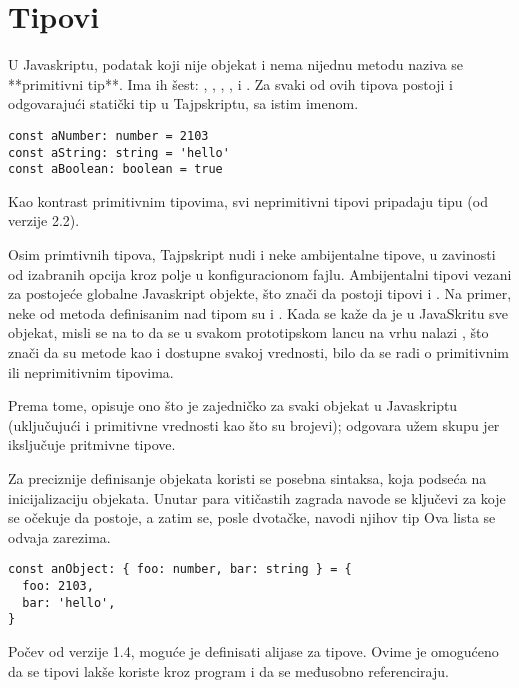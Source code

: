 \section{Tipovi}

U Javaskriptu, podatak koji nije objekat i nema nijednu metodu naziva se **primitivni tip**.
Ima ih šest: , , , ,  i .
Za svaki od ovih tipova postoji i odgovarajući statički tip u Tajpskriptu, sa istim imenom.

\begin{verbatim}
const aNumber: number = 2103
const aString: string = 'hello'
const aBoolean: boolean = true
\end{verbatim}

Kao kontrast primitivnim tipovima, svi neprimitivni tipovi pripadaju tipu  (od verzije 2.2).

Osim primtivnih tipova, Tajpskript nudi i neke ambijentalne tipove, u zavinosti od izabranih opcija kroz polje  u konfiguracionom fajlu.
Ambijentalni tipovi vezani za postojeće globalne Javaskript objekte, što znači da postoji tipovi  i .
Na primer, neke od metoda definisanim nad tipom  su  i .
Kada se kaže da je u JavaSkritu sve objekat, misli se na to da se u svakom prototipskom lancu na vrhu nalazi , što znači da su metode kao  i  dostupne svakoj vrednosti, bilo da se radi o primitivnim ili neprimitivnim tipovima.

Prema tome,  opisuje ono što je zajedničko za svaki objekat u Javaskriptu (uključujući i primitivne vrednosti kao što su brojevi);  odgovara užem skupu jer iksljučuje pritmivne tipove.

Za preciznije definisanje objekata koristi se posebna sintaksa, koja podseća na inicijalizaciju objekata.
Unutar para vitičastih zagrada navode se ključevi za koje se očekuje da postoje, a zatim se, posle dvotačke, navodi njihov tip
Ova lista se odvaja zarezima.

\begin{verbatim}
const anObject: { foo: number, bar: string } = {
  foo: 2103,
  bar: 'hello',
}
\end{verbatim}

Počev od verzije 1.4, moguće je definisati alijase za tipove.
Ovime je omogućeno da se tipovi lakše koriste kroz program i da se međusobno referenciraju.

